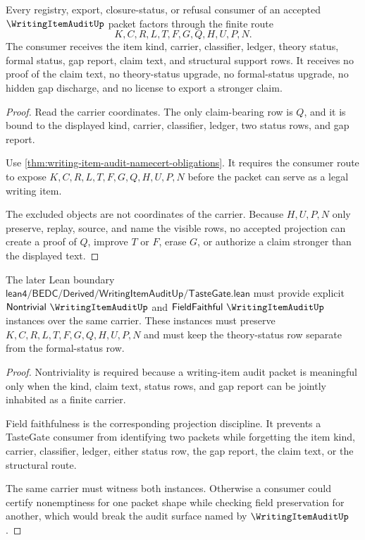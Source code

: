 \begin{theorem}
\label{thm:writing-item-audit-nonescape}
Every registry, export, closure-status, or refusal consumer of an accepted $\WritingItemAuditUp$ packet factors through the finite route
$$
K,C,R,L,T,F,G,Q,H,U,P,N.
$$
The consumer receives the item kind, carrier, classifier, ledger, theory status, formal status, gap report, claim text, and structural support rows. It receives no proof of the claim text, no theory-status upgrade, no formal-status upgrade, no hidden gap discharge, and no license to export a stronger claim.
\end{theorem}
\begin{proof}
Read the carrier coordinates. The only claim-bearing row is $Q$, and it is bound to the displayed kind, carrier, classifier, ledger, two status rows, and gap report.

Use \autoref{thm:writing-item-audit-namecert-obligations}. It requires the consumer route to expose $K,C,R,L,T,F,G,Q,H,U,P,N$ before the packet can serve as a legal writing item.

The excluded objects are not coordinates of the carrier. Because $H,U,P,N$ only preserve, replay, source, and name the visible rows, no accepted projection can create a proof of $Q$, improve $T$ or $F$, erase $G$, or authorize a claim stronger than the displayed text.
\end{proof}

\begin{theorem}
\label{thm:writing-item-audit-tastegate-obligation}
The later Lean boundary $\mathsf{lean4/BEDC/Derived/WritingItemAuditUp/TasteGate.lean}$ must provide explicit $\mathsf{Nontrivial}\ \WritingItemAuditUp$ and $\mathsf{FieldFaithful}\ \WritingItemAuditUp$ instances over the same carrier. These instances must preserve $K,C,R,L,T,F,G,Q,H,U,P,N$ and must keep the theory-status row separate from the formal-status row.
\end{theorem}
\begin{proof}
Nontriviality is required because a writing-item audit packet is meaningful only when the kind, claim text, status rows, and gap report can be jointly inhabited as a finite carrier.

Field faithfulness is the corresponding projection discipline. It prevents a TasteGate consumer from identifying two packets while forgetting the item kind, carrier, classifier, ledger, either status row, the gap report, the claim text, or the structural route.

The same carrier must witness both instances. Otherwise a consumer could certify nonemptiness for one packet shape while checking field preservation for another, which would break the audit surface named by $\WritingItemAuditUp$.
\end{proof}


